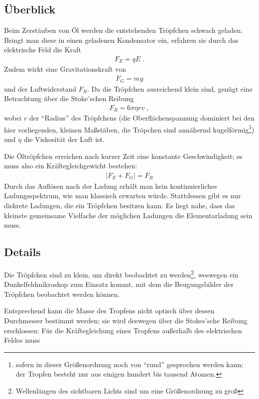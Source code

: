 
\subsection{Überblick}
\label{sub:der_millikanversuch}
  Beim Zerstäuben von Öl werden die entstehenden Tröpfchen schwach geladen. Bringt man diese in einen geladenen Kondensator ein, erfahren sie durch das elektrische Feld die Kraft
  \begin{align*}
    F_E = q E \;.
  \end{align*}
  Zudem wirkt eine Gravitationskraft von
  \begin{align*}
    F_G = m g
  \end{align*}
  und der Luftwiderstand $F_R$. Da die Tröpfchen ausreichend klein sind, genügt eine Betrachtung über die Stoke'schen Reibung
  \begin{align*}
    F_R = 6 \pi \eta r v \;,
  \end{align*}
  wobei $r$ der ``Radius'' des Tröpfchens (die Oberflächenspannung dominiert bei den hier vorliegenden, kleinen Maßstäben, die Tröpchen sind annähernd kugelförmig\footnote{sofern in dieser Größenordnung noch von ``rund'' gesprochen werden kann; der Tropfen besteht nur aus einigen hundert bis tausend Atomen.}) und $\eta$ die Viskosität der Luft ist.

  Die Öltröpfchen erreichen nach kurzer Zeit eine konstante Geschwindigkeit; es muss also ein Kräftegleichgewicht bestehen:
  \begin{align*}
    |F_E+F_G| = F_R
  \end{align*}
  Durch das Auflösen nach der Ladung erhält man kein kontinuierliches Ladungsspektrum, wie man klassisch erwarten würde. Stattdessen gibt es nur diskrete Ladungen, die ein Tröpfchen besitzen kann. Es liegt nahe, dass das kleinste gemeinsame Vielfache der möglichen Ladungen die Elementarladung sein muss.

\subsection{Details}
\label{sub:details}
  Die Tröpfchen sind zu klein, um direkt beobachtet zu werden\footnote{Wellenlängen des sichtbaren Lichts sind um eine Größenordnung zu groß}, weswegen ein Dunkelfeldmikroskop zum Einsatz kommt, mit dem die Beugungsbilder der Tröpfchen beobachtet werden können.

  Entsprechend kann die Masse des Tropfens nicht optisch über dessen Durchmesser bestimmt werden; sie wird deswegen über die Stokes'sche Reibung erschlossen: Für die Kräftegleichung eines Tropfens außerhalb des elektrischen Feldes muss


